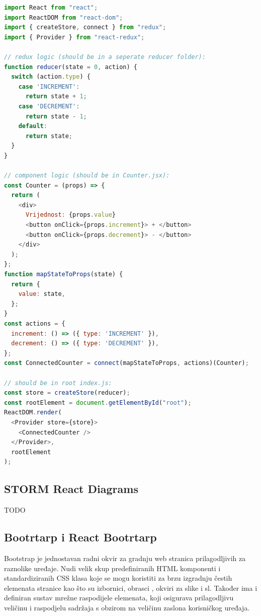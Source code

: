 \documentclass[times, utf8, diplomski, numeric]{fer}
\newcommand{\razmakp}{\vspace{18pt}}
\newcommand{\razmaks}{\vspace{10pt}}
\begin{document}
\razmakp %
\begin{lstlisting}[language=JavaScript, caption={Primjer korištenja Redux biblioteke u React aplikaciji}, label={lst:redux}]
import React from "react";
import ReactDOM from "react-dom";
import { createStore, connect } from "redux";
import { Provider } from "react-redux";

// redux logic (should be in a seperate reducer folder):
function reducer(state = 0, action) {
  switch (action.type) {
    case 'INCREMENT':
      return state + 1;
    case 'DECREMENT':
      return state - 1;
    default:
      return state;
  }
}

// component logic (should be in Counter.jsx):
const Counter = (props) => {
  return (
    <div>
      Vrijednost: {props.value}
      <button onClick={props.increment}> + </button>
      <button onClick={props.decrement}> - </button>
    </div>
  );
};
function mapStateToProps(state) {
  return {
    value: state,
  };
}
const actions = {
  increment: () => ({ type: 'INCREMENT' }),
  decrement: () => ({ type: 'DECREMENT' }),
};
const ConnectedCounter = connect(mapStateToProps, actions)(Counter);

// should be in root index.js:
const store = createStore(reducer);
const rootElement = document.getElementById("root");
ReactDOM.render(
  <Provider store={store}>
    <ConnectedCounter />
  </Provider>,
  rootElement
);
\end{lstlisting}
\razmaks


\razmaks
\subsection{STORM React Diagrams}

TODO


\razmaks
\subsection{Bootrtarp i React Bootrtarp}

Bootstrap je jednostavan radni okvir za gradnju web stranica prilagodljivih za raznolike uređaje.
Nudi velik skup predefiniranih HTML komponenti i standardiziranih CSS klasa koje se mogu koristiti za brzu izgradnju čestih elemenata stranice kao što su izbornici, obrasci , okviri za slike i sl.
Također ima i definiran sustav mrežne raspodijele elemenata, koji osigurava prilagodljivu veličinu i raspodjelu sadržaja s obzirom na veličinu zaslona korisničkog uređaja.
\end{document}
